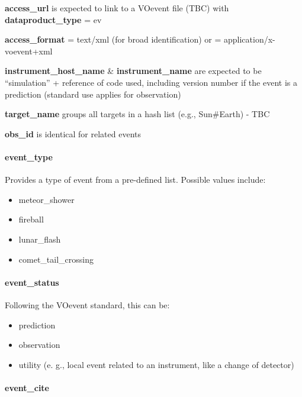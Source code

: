\documentclass[11pt,a4paper]{ivoa}
\begin{document}
\textbf{access\_url} is expected to link to a VOevent file (TBC) with \textbf{dataproduct\_type} = ev 

\textbf{access\_format} = text/xml (for broad identification) or = application/x-voevent+xml 

\textbf{instrument\_host\_name }\& \textbf{instrument\_name} are expected to be ``simulation'' + reference of code used, including version number if the event is a prediction (standard use applies for observation)

\textbf{target\_name} groups all targets in a hash list (e.g., Sun\#Earth) - TBC

\textbf{obs\_id} is identical for related events

\paragraph{event\_type}

Provides a type of event from a pre-defined list. Possible values include:

\begin{itemize}

\item meteor\_shower

\item fireball

\item lunar\_flash

\item comet\_tail\_crossing

\end{itemize}

\paragraph{event\_status}

Following the VOevent standard, this can be:

\begin{itemize}

\item prediction

\item observation

\item utility (e. g., local event related to an instrument, like a change of detector)

\end{itemize}

\paragraph{event\_cite}
\end{document}
